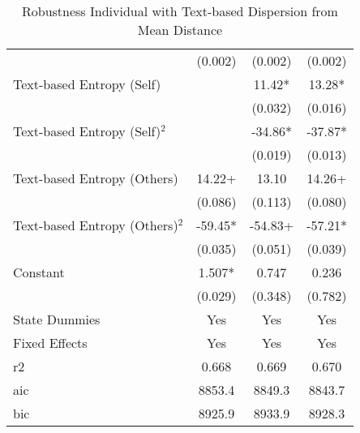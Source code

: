 \begin{table}[]
\begin{tabular}{@{}lccc@{}}
                                                           & (0.002)    & (0.002)    & (0.002)    \\
Text-based Entropy (Self)                                  &            & 11.42*     & 13.28*     \\
                                                           &            & (0.032)    & (0.016)    \\
Text-based Entropy (Self)$^2$    &            & -34.86*    & -37.87*    \\
                                                           &            & (0.019)    & (0.013)    \\
Text-based Entropy (Others)                                & 14.22+     & 13.10      & 14.26+     \\
                                                           & (0.086)    & (0.113)    & (0.080)    \\
Text-based Entropy (Others)$^2$  & -59.45*    & -54.83+    & -57.21*    \\
                                                           & (0.035)    & (0.051)    & (0.039)    \\
Constant                                                   & 1.507*     & 0.747      & 0.236      \\
                                                           & (0.029)    & (0.348)    & (0.782)    \\
State Dummies  & Yes        & Yes        & Yes        \\
Fixed Effects  & Yes        & Yes        & Yes        \\                                                           
r2                                                         & 0.668      & 0.669      & 0.670      \\
aic                                                        & 8853.4     & 8849.3     & 8843.7     \\
bic                                                        & 8925.9     & 8933.9     & 8928.3     \\ \bottomrule
\end{tabular}
\caption{Robustness Individual with Text-based Dispersion from Mean Distance}
\label{reg_ind_rob_text_mean}
\end{table}